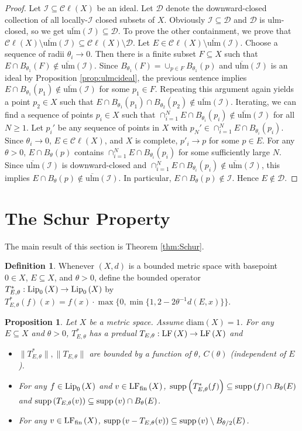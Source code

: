\documentclass[12pt]{amsart}
\newtheorem{prop}[theorem]{Proposition}
\theoremstyle{definition}
\newtheorem{definition}[theorem]{Definition}
\numberwithin{equation}{section}
\def \D {\mathcal{D}}
\def \I {\mathcal{I}}
\def \sbs {\subseteq}
\newcommand{\Cl}[1]{\mathcal{C}\ell\left(#1\right)}
\newcommand{\diam}[1]{\mathrm{diam}\left( #1 \right)}
\newcommand{\ulmc}[1]{\overline{\mathrm{ulm}}\left(#1\right)}
\begin{document}
\begin{proof}
Let $\I \sbs \Cl{X}$ be an ideal. Let $\D$ denote the downward-closed collection of all locally-$\I$ closed subsets of $X$. Obviously $\I \sbs \D$ and $\D$ is ulm-closed, so we get $\ulmc{\I} \sbs \D$. To prove the other containment, we prove that $\Cl{X} \setminus \ulmc{\I} \sbs \Cl{X} \setminus \D$. Let $E \in \Cl{X} \setminus \ulmc{\I}$. Choose a sequence of radii $\theta_i \to 0$. Then there is a finite subset $F \sbs X$ such that $E \cap B_{\theta_1}(F) \not\in \ulmc{\I}$. Since $B_{\theta_1}(F) = \cup_{p \in F} B_{\theta_1}(p)$ and $\ulmc{\I}$ is an ideal by Proposition \ref{prop:ulmcideal}, the previous sentence implies $E \cap B_{\theta_1}(p_1) \not\in \ulmc{\I}$ for some $p_1 \in F$. Repeating this argument again yields a point $p_2 \in X$ such that $E \cap B_{\theta_1}(p_1) \cap B_{\theta_2}(p_2) \not\in \ulmc{\I}$. Iterating, we can find a sequence of points $p_i \in X$ such that $\cap_{i=1}^N E \cap B_{\theta_i}(p_i) \not\in \ulmc{\I}$ for all $N \geq 1$. Let $p_i'$ be any sequence of points in $X$ with $p_N' \in \cap_{i=1}^N E \cap B_{\theta_i}(p_i)$. Since $\theta_i \to 0$, $E \in \Cl{X}$, and $X$ is complete, $p'_i \to p$ for some $p \in E$. For any $\theta > 0$, $E \cap B_\theta(p)$ contains $\cap_{i=1}^N E \cap B_{\theta_i}(p_i)$ for some sufficiently large $N$. Since $\ulmc{\I}$ is downward-closed and $\cap_{i=1}^N E \cap B_{\theta_i}(p_i) \not\in \ulmc{\I}$, this implies $E \cap B_\theta(p) \not\in \ulmc{\I}$. In particular, $E \cap B_\theta(p) \not\in \I$. Hence $E \not\in \D$.
\end{proof}

\section{The Schur Property}
The main result of this section is Theorem \ref{thm:Schur}.

\begin{definition} \label{def:T}
Whenever $(X,d)$ is a bounded metric space with basepoint $0 \in X$, $E \sbs X$, and $\theta > 0$, define the bounded operator $T^*_{E,\theta}: \Lip{X} \to \Lip{X}$ by $T^*_{E,\theta}(f)(x) = f(x)\cdot\max\{0,\min\{1,2-2\theta^{-1}d(E,x)\}\}$.
\end{definition}

\begin{prop} \label{prop:T}
Let $X$ be a metric space. Assume $\diam{X} = 1$. For any $E \sbs X$ and $\theta > 0$, $T^*_{E,\theta}$ has a predual $T_{E,\theta}: \LF{X} \to \LF{X}$ and
\begin{itemize}
\item $\|T^*_{E,\theta}\|,\|T_{E,\theta}\|$ are bounded by a function of $\theta$, $C(\theta)$ (independent of $E$).
\item For any $f \in \Lip{X}$ and $v \in \LFf{X}$, $\supp{T^*_{E,\theta}(f)} \sbs \supp{f} \cap B_\theta(E)$ and $\supp{T_{E,\theta}(v)} \sbs \supp{v} \cap B_\theta(E)$.
\item For any $v \in \LFf{X}$, $\supp{v-T_{E,\theta}(v)} \sbs \supp{v} \setminus B_{\theta/2}(E)$.
\end{itemize}
\end{prop}
\end{document}
